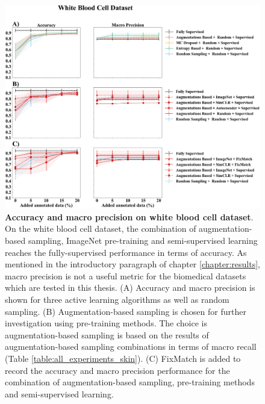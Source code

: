 \begin{figure}[htbp]
\centering
\captionsetup{format=plain}
\includegraphics[width=\textwidth]{figures/fig_2_white_acc_precision.png}
\caption[Accuracy and macro precision on white blood cell dataset]{\textbf{Accuracy and macro precision on white blood cell dataset}. On the white blood cell dataset, the combination of augmentation-based sampling, ImageNet pre-training and semi-supervised learning reaches the fully-supervised performance in terms of accuracy. As mentioned in the introductory paragraph of chapter \ref{chapter:results}, macro precision is not a useful metric for the biomedical datasets which are tested in this thesis. (A) Accuracy and macro precision is shown for three active learning algorithms as well as random sampling. (B) Augmentation-based sampling is chosen for further investigation using pre-training methods. The choice is augmentation-based sampling is based on the results of augmentation-based sampling combinations in terms of macro recall (Table \ref{table:all_experiments_skin}). (C) FixMatch is added to record the accuracy and macro precision performance for the combination of augmentation-based sampling, pre-training methods and semi-supervised learning.}
\label{fig:fig_2_white_acc_precision}
\end{figure}


